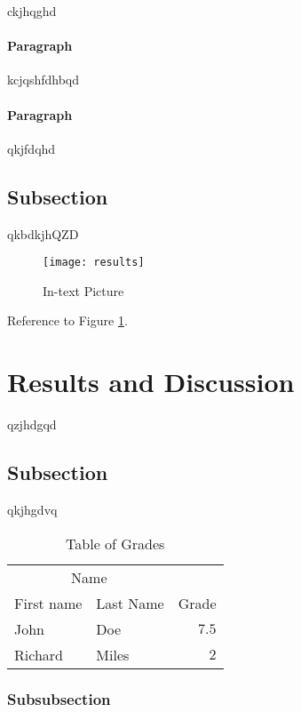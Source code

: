 \documentclass[fleqn,10pt]{SelfArx} %
\begin{document}
ckjhqghd

\paragraph{Paragraph} kcjqshfdhbqd
\paragraph{Paragraph} qkjfdqhd

\subsection{Subsection}

qkbdkjhQZD

\begin{figure}[ht]\centering
	\texttt{[image: results]}
	\caption{In-text Picture}
	\label{fig:results}
\end{figure}

Reference to Figure \ref{fig:results}.


\section{Results and Discussion}

qzjhdgqd

\subsection{Subsection}

qkjhgdvq

\begin{table}[hbt]
	\caption{Table of Grades}
	\centering
	\begin{tabular}{llr}
		\toprule
		\multicolumn{2}{c}{Name} \\
		\cmidrule(r){1-2}
		First name & Last Name & Grade \\
		\midrule
		John & Doe & $7.5$ \\
		Richard & Miles & $2$ \\
		\bottomrule
	\end{tabular}
	\label{tab:label}
\end{table}

\subsubsection{Subsubsection}
\end{document}
